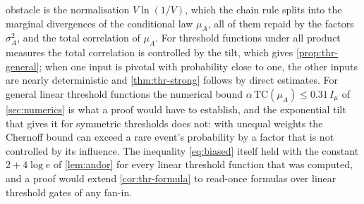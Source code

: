 \documentclass[11pt]{amsart}
\theoremstyle{definition}
\theoremstyle{remark}
\begin{document}
obstacle is the normalisation $V\ln(1/V)$, which the chain rule splits into the marginal divergences of the
conditional law $\mu_A$, all of them repaid by the factors $\sigma_A^2$, and the total correlation of $\mu_A$. For
threshold functions under all product measures the total correlation is controlled by the tilt, which gives
\cref{prop:thr-general}; when one input is pivotal with probability close to one, the other inputs are nearly
deterministic and \cref{thm:thr-strong} follows by direct estimates. For general linear threshold functions the numerical bound $\alpha\,\mathrm{TC}(\mu_A)\le0.31\,I_\mu$ of
\cref{sec:numerics} is what a proof would have to establish, and the exponential tilt that gives it for symmetric
thresholds does not: with unequal weights the Chernoff bound can exceed a rare event's probability by a factor that
is not controlled by its influence. The inequality \eqref{eq:biased} itself held with the constant $2+4\log e$ of
\cref{lem:andor} for every linear threshold function that was computed, and a proof would extend
\cref{cor:thr-formula} to read-once formulas over linear threshold gates of any fan-in.
\end{document}
